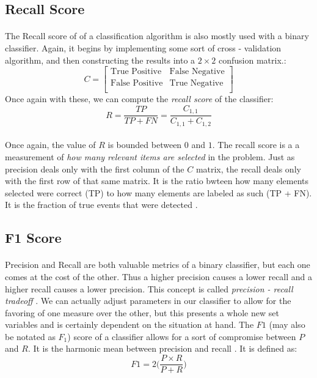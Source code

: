 \documentclass[12pt,letterpaper]{article}
\begin{document}

\subsection{Recall Score}
\paragraph*{}The Recall score of of a classification algorithm is also mostly used with a binary classifier. Again, it begins by implementing some sort of cross - validation algorithm, and then constructing the results into a $2 \times 2$ confusion matrix.:
\begin{equation}
C = 
\begin{bmatrix}
\text{True Positive} & \text{False Negative} \\
\text{False Positive} & \text{True Negative} \\
\end{bmatrix}
\end{equation}
Once again with these, we can compute the \textit{recall score} of the classifier:
\begin{equation}
\label{recall score}
R = \frac{TP}{TP + FN} = \frac{C_{1,1}}{C_{1,1}+C_{1,2}}
\end{equation}
\paragraph*{}Once again, the value of $R$ is bounded between $0$ and $1$. The recall score is a a measurement of \textit{how many relevant items are selected} in the problem. Just as precision deals only with the first column of the $C$ matrix, the recall deals only with the first row of that same matrix. It is the ratio bwteen how many elements selected were correct (TP) to how many elements are labeled as such (TP + FN). It is the fraction of true events that were detected \cite{Goodfellow}.


\subsection{F1 Score}
\paragraph*{}Precision and Recall are both valuable metrics of a binary classifier, but each one comes at the cost of the other. Thus a higher precision causes a lower recall and a higher recall causes a lower precision. This concept is called \textit{precision - recall tradeoff} \cite{Geron}. We can actually adjust parameters in our classifier to allow for the favoring of one measure over the other, but this presents a whole new set variables and is certainly dependent on the situation at hand.  The $F1$ (may also be notated as $F_1$) score of a classifier allows for a sort of compromise between $P$ and $R$. It is the harmonic mean between precision and recall \cite{Goodfellow}. It is defined as:
\begin{equation}
\label{F1 score}
F1 = 2\Big(\frac{P \times R}{P + R}\Big)
\end{equation}
\end{document}
